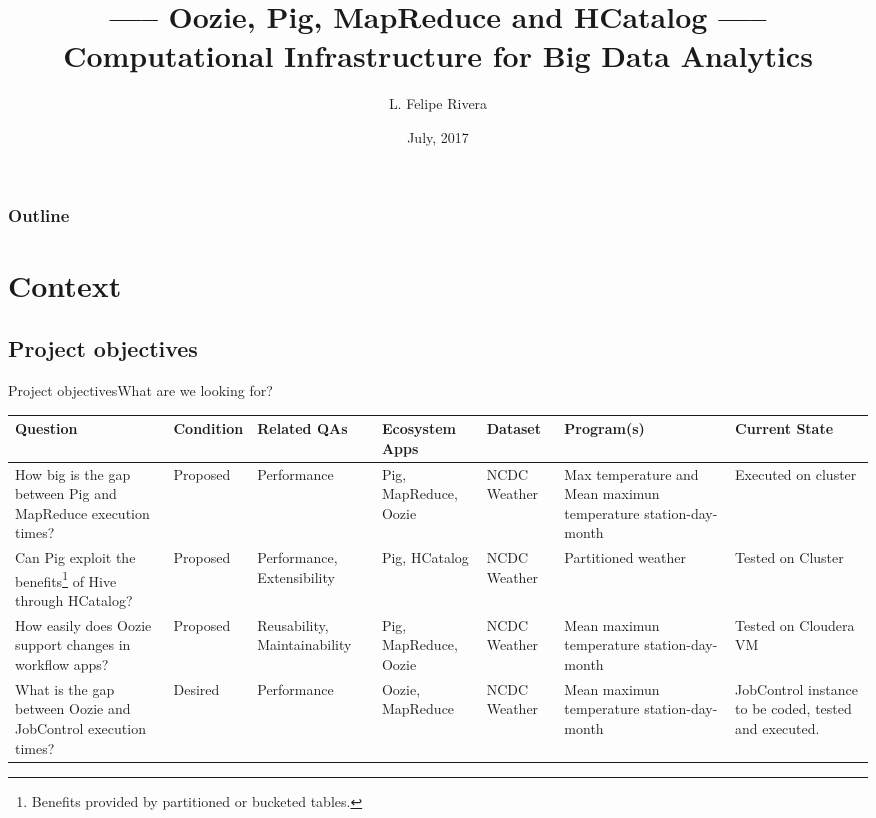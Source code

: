 \documentclass{beamer}
\title{----- Oozie, Pig, MapReduce and HCatalog ----- Computational Infrastructure for Big Data Analytics}
\author{L. Felipe Rivera}
\institute[Icesi University] %
{
 
  School of Engineering
  
}
\date{July, 2017}
\begin{document}
\begin{frame}
  \titlepage
\end{frame}

\begin{frame}[allowframebreaks]
\frametitle<presentation>{Outline}
  \tableofcontents
\end{frame}

\section{Context}

\subsection{Project objectives}

\begin{frame}{Project objectives}{What are we looking for?}

{\tiny
\begin{center}
    \begin{tabular}{ | p{2.5cm} | p{0.8cm} | p{1.2cm} | p{1.2cm}| p{0.6cm} | p{1.8cm} | p{1.2cm} |}
    \hline
    \textbf{Question} & \textbf{Condition} & \textbf{Related QAs} & \textbf{Ecosystem Apps} & \textbf{Dataset} & \textbf{Program(s)} & \textbf{Current State} \\ \hline
    
    How big is the gap between Pig and MapReduce execution times? & Proposed & Performance & Pig, MapReduce, Oozie & NCDC Weather & Max temperature and Mean maximun temperature station-day-month  & Executed on cluster \\ \hline
   
    Can Pig exploit the benefits\footnote{Benefits provided by partitioned or bucketed tables.} of Hive through HCatalog?  & Proposed & Performance, Extensibility  & Pig, HCatalog & NCDC Weather & Partitioned weather & Tested on Cluster \\ \hline
    
    How easily does Oozie support changes in workflow apps? & Proposed & Reusability, Maintainability & Pig, MapReduce, Oozie & NCDC Weather & Mean maximun temperature station-day-month & Tested on Cloudera VM \\ \hline
    
    What is the gap between Oozie and JobControl execution times? & Desired & Performance & Oozie, MapReduce & NCDC Weather & Mean maximun temperature station-day-month & JobControl instance to be coded, tested and executed. \\ 
   

    \hline
    \end{tabular}
\end{center}
}

\end{frame}
\end{document}
